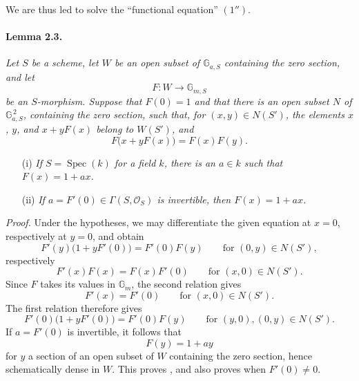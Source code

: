 We are thus led to solve the ``functional equation'' \((1'')\).

\paragraph{\textbf{Lemma 2.3.}}
\emph{Let \(S\) be a scheme, let \(W\) be an open subset of
\(\mathbb G_{a,S}\) containing the zero section, and let}
\[
  F\colon W\longrightarrow\mathbb G_{m,S}
\]
\emph{be an \(S\)-morphism. Suppose that \(F(0)=1\) and that there
is an open subset \(N\) of \(\mathbb G_{a,S}^{\,2}\), containing
the zero section, such that, for \((x,y)\in N(S')\), the elements
\(x\), \(y\), and \(x+yF(x)\) belong to \(W(S')\), and}
\begin{equation}\tag{\(\dagger\)}
  F\bigl(x+yF(x)\bigr)=F(x)F(y).
\end{equation}
\begin{enumerate}
\item[\textup{\SGAInlineRefTarget{sga3:xx:2.3:item:i}(i)}] \emph{If \(S=\operatorname{Spec}(k)\) for a
  field \(k\), there is an \(a\in k\) such that
  \(F(x)=1+ax\).}
\item[\textup{\SGAInlineRefTarget{sga3:xx:2.3:item:ii}(ii)}] \emph{If
  \(a=F'(0)\in\Gamma(S,\mathscr O_S)\) is invertible, then
  \(F(x)=1+ax\).}
\end{enumerate}

\medskip
\noindent\emph{Proof.}
Under the hypotheses, we may differentiate the given equation at
\(x=0\), respectively at \(y=0\), and obtain
\begin{equation}\tag{\(\ast\)}
  F'(y)\bigl(1+yF'(0)\bigr)=F'(0)F(y)
  \qquad\text{for }(0,y)\in N(S'),
\end{equation}
respectively
\[
  F'(x)F(x)=F(x)F'(0)
  \qquad\text{for }(x,0)\in N(S').
\]
Since \(F\) takes its values in \(\mathbb G_m\), the second
relation gives
\begin{equation}\tag{\(\ast'\)}
  F'(x)=F'(0)\qquad\text{for }(x,0)\in N(S').
\end{equation}
The first relation therefore gives
\[
  F'(0)\bigl(1+yF'(0)\bigr)=F'(0)F(y)
  \qquad\text{for }(y,0),(0,y)\in N(S').
\]
If \(a=F'(0)\) is invertible, it follows that
\[
  F(y)=1+ay
\]
for \(y\) a section of an open subset of \(W\) containing the zero
section, hence schematically dense in \(W\). This proves
\textup{}, and also proves \textup{} when \(F'(0)\ne0\).


